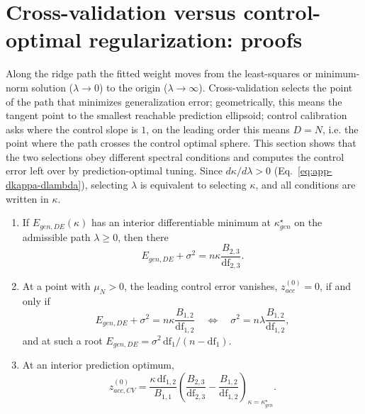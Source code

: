 \section{Cross-validation versus control-optimal regularization: proofs}
\label{sec:app-optimal-regularization}

Along the ridge path the fitted weight moves from the least-squares or
minimum-norm solution ($\lambda\to0$) to the origin ($\lambda\to\infty$).
Cross-validation selects the point of the path that minimizes generalization error; geometrically, this means the tangent point to the smallest reachable prediction ellipsoid; 
control calibration asks where the control slope is $1$, on the leading order this means $D=N$, i.e. the point where the path crosses the control optimal sphere. 
This section shows that the two selections obey different spectral conditions and computes the control error left over
by prediction-optimal tuning.  
Since $d\kappa/d\lambda>0$
(Eq.~\ref{eq:app-dkappa-dlambda}), selecting $\lambda$ is equivalent to selecting $\kappa$, and all conditions are written in $\kappa$.

\begin{prop}
\label{prop:app-prediction-control-optima}
\leavevmode
\begin{enumerate}
\item If $E_{gen,DE}(\kappa)$ has an interior differentiable minimum at
$\kappa^\star_{gen}$ on the admissible path $\lambda\ge0$, then there
\begin{equation}
E_{gen,DE}+\sigma^2=n\kappa\frac{B_{2,3}}{\mathrm{df}_{2,3}} .
\label{eq:appendix-pixel-prediction-stationary}
\end{equation}
\item At a point with $\mu_N>0$, the leading control error vanishes,
$z^{(0)}_{acc}=0$, if and only if
\begin{equation}
E_{gen,DE}+\sigma^2=n\kappa\frac{B_{1,2}}{\mathrm{df}_{1,2}}
\quad\Longleftrightarrow\quad
\sigma^2=n\lambda\frac{B_{1,2}}{\mathrm{df}_{1,2}},
\label{eq:appendix-pixel-control-noise}
\end{equation}
and at such a root $E_{gen,DE}=\sigma^2\,\mathrm{df}_1/(n-\mathrm{df}_1)$.
\item At an interior prediction optimum,
\begin{equation}
z^{(0)}_{acc,CV}=\frac{\kappa\,\mathrm{df}_{1,2}}{B_{1,1}}
\left(\frac{B_{2,3}}{\mathrm{df}_{2,3}}-\frac{B_{1,2}}{\mathrm{df}_{1,2}}\right)_{\kappa=\kappa^\star_{gen}} .
\label{eq:app-zacc-cv-summary}
\end{equation}
\end{enumerate}
\end{prop}

